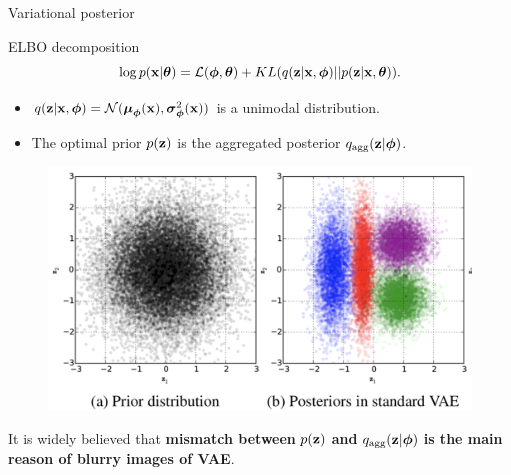 \begin{frame}{Variational posterior}
	\vspace{-0.3cm}
	\begin{block}{ELBO decomposition}
		\vspace{-0.3cm}
		\[
			\log p(\mathbf{x} | \boldsymbol{\theta}) = \mathcal{L}(\boldsymbol{\phi}, \boldsymbol{\theta}) + KL(q(\mathbf{z} | \mathbf{x}, \boldsymbol{\phi}) || p(\mathbf{z} | \mathbf{x}, \boldsymbol{\theta})).
		\]
		\vspace{-0.7cm}
	\end{block}
	\begin{itemize}
		\item $q(\mathbf{z} | \mathbf{x}, \boldsymbol{\phi}) = \mathcal{N}(\boldsymbol{\mu}_{\boldsymbol{\phi}}(\mathbf{x}), \boldsymbol{\sigma}^2_{\boldsymbol{\phi}}(\mathbf{x}))$ is a unimodal distribution. 
		\item The optimal prior $p(\mathbf{z})$ is the aggregated posterior $q_{\text{agg}}(\mathbf{z} | \boldsymbol{\phi})$.
	\end{itemize}
	
	\vspace{-0.3cm}
	\begin{figure}
		\includegraphics[width=0.65\linewidth]{figs/agg_posterior}
	\end{figure}
	\vspace{-0.3cm}
	It is widely believed that \textbf{mismatch between} $p(\mathbf{z})$  \textbf{and} $q_{\text{agg}}(\mathbf{z} | \boldsymbol{\phi})$  \textbf{is the main reason of blurry images of VAE}.
\end{frame}
